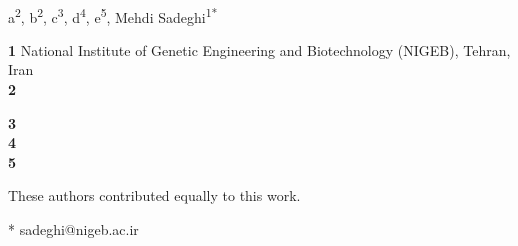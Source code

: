 \documentclass[10pt,letterpaper]{article}
\begin{document}
\vspace*{0.2in}

\begin{flushleft}
{\Large
\textbf{} %
}
\newline
\\

a\textsuperscript{2\Yinyang},
b\textsuperscript{2\Yinyang},
c\textsuperscript{3},
d\textsuperscript{4},
e\textsuperscript{5},
Mehdi Sadeghi\textsuperscript{1*}

\bigskip
\textbf{1} National Institute of Genetic Engineering and Biotechnology (NIGEB), Tehran, Iran
\\
\textbf{2} 

\textbf{3} 
\\
\textbf{4} 
\\
\textbf{5} 

\bigskip


% 
%
\Yinyang These authors contributed equally to this work. 

* sadeghi@nigeb.ac.ir









\end{flushleft}
\end{document}
